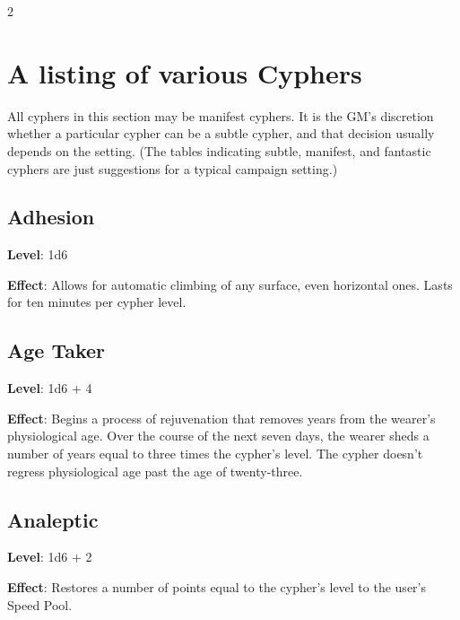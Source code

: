 \begin{multicols}{2}

\section{A listing of various Cyphers}

All cyphers in this section may be manifest cyphers. It is the GM’s discretion whether a particular cypher can be a subtle cypher, and that decision usually depends on the setting. (The tables indicating subtle, manifest, and fantastic cyphers are just suggestions for a typical campaign setting.)

\subsection{Adhesion}

\textbf{Level}: 1d6

\textbf{Effect}: Allows for automatic climbing of any surface, even horizontal ones. Lasts for ten minutes per cypher level.

\subsection{Age Taker}

\textbf{Level}: 1d6 + 4

\textbf{Effect}: Begins a process of rejuvenation that removes years from the wearer’s physiological age. Over the course of the next seven days, the wearer sheds a number of years equal to three times the cypher’s level. The cypher doesn’t regress physiological age past the age of
twenty-three.

\subsection{Analeptic}

\textbf{Level}: 1d6 + 2

\textbf{Effect}: Restores a number of points equal to the cypher’s level to the user’s Speed Pool.


\end{multicols}
